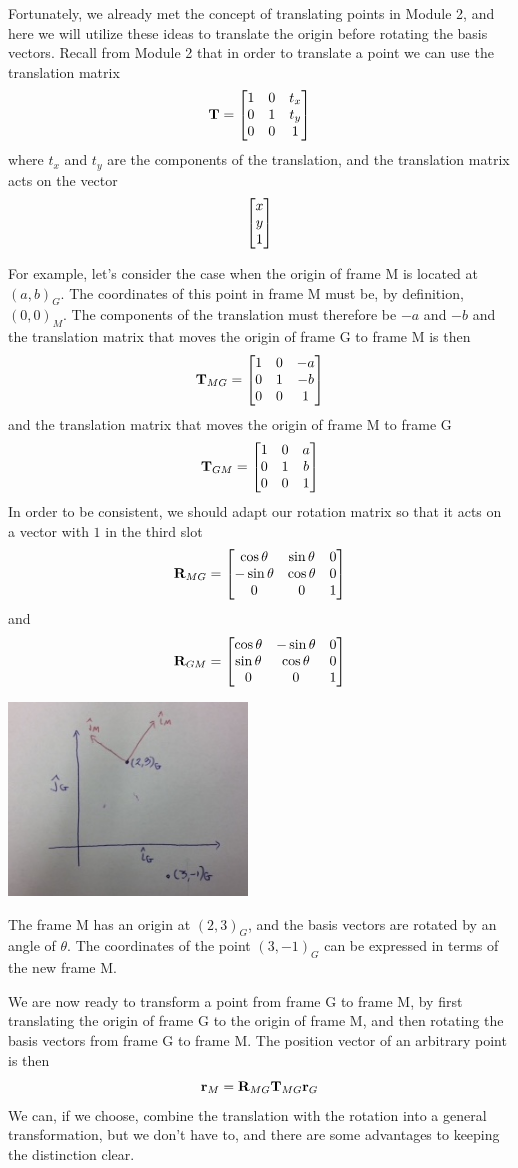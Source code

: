 \documentclass[M3_Night6_Solutions]{subfiles}
\begin{document}
\begin{enumerate}[series=exercises, label=\textbf{Exercise} (\arabic*)]
Fortunately, we already met the concept of translating points in Module 2, and here we will utilize these ideas to translate the origin before rotating the basis vectors.  Recall from Module 2 that in order to translate a point we can use the translation matrix
\[\mathbf{T} = \begin{bmatrix} 1 & 0 & t_x \\ 0 & 1 & t_y \\ 0 & 0 & 1 \end{bmatrix} \]
where $t_x$ and $t_y$ are the components of the translation, and the translation matrix acts on the vector
\[\begin{bmatrix} x \\ y \\ 1 \end{bmatrix} \]

For example, let's consider the case when the origin of frame M is located at $(a,b)_G$. The coordinates of this point in frame M must be, by definition, $(0,0)_M$. The components of the translation must therefore be $-a$ and $-b$ and the translation matrix that moves the origin of frame G to frame M is then
\[\mathbf{T}_{MG} = \begin{bmatrix} 1 & 0 & -a \\ 0 & 1 & -b \\ 0 & 0 & 1 \end{bmatrix} \]
and the translation matrix that moves the origin of frame M to frame G
\[\mathbf{T}_{GM} = \begin{bmatrix} 1 & 0 & a \\ 0 & 1 & b \\ 0 & 0 & 1 \end{bmatrix} \]
In order to be consistent, we should adapt our rotation matrix so that it acts on a vector with $1$ in the third slot
\[\mathbf{R}_{MG} = \begin{bmatrix} \cos \theta & \sin \theta & 0 \\ -\sin \theta & \cos \theta & 0 \\ 0 & 0 & 1 \end{bmatrix} \]
and
\[\mathbf{R}_{GM} = \begin{bmatrix} \cos \theta & -\sin \theta & 0 \\ \sin \theta & \cos \theta & 0 \\ 0 & 0 & 1 \end{bmatrix} \]

\begin{marginfigure}
\includegraphics[width=2.5in]{figs/newnewframe}
\caption{The frame M has an origin at $(2,3)_G$, and the basis vectors are rotated by an angle of $\theta$. The coordinates of the point $(3,-1)_G$ can be expressed in terms of the new frame M.}
\label{fig:globalframe}
\end{marginfigure}

We are now ready to transform a point from frame G to frame M, by first translating the origin of frame G to the origin of frame M, and then rotating the basis vectors from frame G to frame M. The position vector of an arbitrary point is then
\[\mathbf{r}_M = \mathbf{R}_{MG} \mathbf{T}_{MG} \mathbf{r}_G \]
We can, if we choose, combine the translation with the rotation into a general transformation, but we don't have to, and there are some advantages to keeping the distinction clear. 


\end{enumerate}
\end{document}
